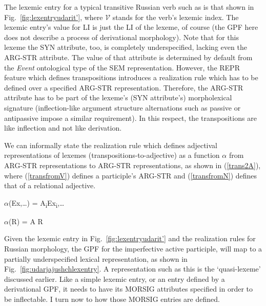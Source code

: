 \documentclass[output=paper,
modfonts
]{LSP/langsci}
\begin{document}
\begin{sloppypar}
The lexemic entry for a typical transitive Russian verb such as  is that shown in Fig.~\ref{fig:lexentryudarit’}, where $\mathcal{V}$ stands for the verb’s lexemic index. The lexemic entry’s value for LI is just the LI of the lexeme, of course (the GPF here does not describe  a process of derivational morphology). %
Note that for this lexeme the SYN attribute, too, is completely underspecified, lacking even the ARG-STR attribute. The value of that attribute is determined by default from the \emph{Event} ontological type of the SEM representation. However, the REPR feature which defines transpositions introduces a realization rule which has to be defined over a specified ARG-STR representation. Therefore, the ARG-STR attribute has to be part of the lexeme’s (SYN attribute’s) morpholexical signature (inflection-like argument structure alternations such as passive or antipassive impose a similar requirement). In this respect, the transpositions are like inflection and not like derivation. %
\end{sloppypar}

We can informally state the realization rule which defines adjectival representations of lexemes (transpositions-to-adjective) as a function $\alpha$ from ARG-STR representations to ARG-STR representations, as shown in (\ref{trans2A}), where (\ref{transfromV}) defines a participle’s ARG-STR and (\ref{transfromN}) defines that of a relational adjective.

\begin{exe}
\ex	\label{trans2A}
	\begin{xlist}
\ex	\label{transfromV} $\alpha$(\lab E\lab x,\ldots\rab\rab) = \lab A\textsubscript{i}\lab E\lab x\textsubscript{i},\ldots\rab\rab\rab

\ex	\label{transfromN} 	$\alpha$(\lab R\rab) = \lab A \lab R\rab\rab
	\end{xlist}
\end{exe}

Given the lexemic entry in Fig.~\ref{fig:lexentryudarit’} and the realization rules for Russian morphology, the GPF for the imperfective active participle,  will map to a partially underspecified lexical representation, as shown in Fig.~\ref{fig:udarjajushchlexentry}.  A representation such as this is the ‘quasi-lexeme’ discussed earlier. Like a simple lexemic entry, or an entry defined by a derivational GPF, it needs to have its MORSIG attributes specified in order to be inflectable. I turn now to how those MORSIG entries are defined. 
\end{document}

